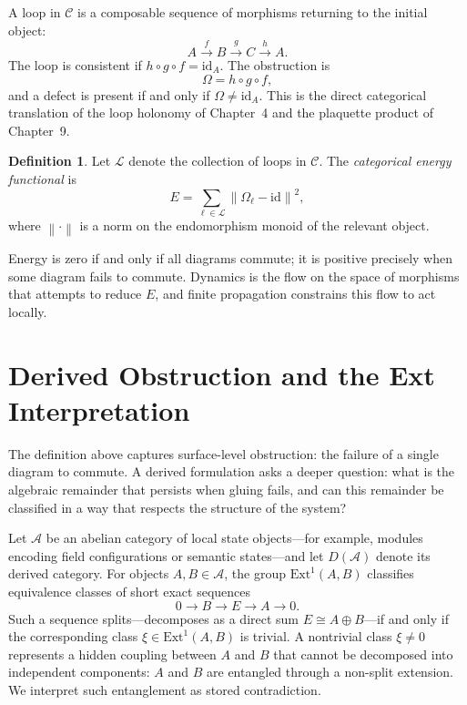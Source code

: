 \documentclass[12pt,a4paper,openany]{book}
\theoremstyle{plain}
\theoremstyle{definition}
\newtheorem{definition}[theorem]{Definition}
\theoremstyle{remark}
\newcommand{\Energy}{E}
\newcommand{\norm}[1]{\left\|#1\right\|}
\begin{document}
A loop in $\mathcal{C}$ is a composable sequence of morphisms returning to the initial object:
\[
A \xrightarrow{f} B \xrightarrow{g} C \xrightarrow{h} A.
\]
The loop is consistent if $h \circ g \circ f = \mathrm{id}_A$. The obstruction is
\[
\Omega = h \circ g \circ f,
\]
and a defect is present if and only if $\Omega \neq \mathrm{id}_A$. This is the direct categorical translation of the loop holonomy of Chapter~4 and the plaquette product of Chapter~9.

\begin{definition}
Let $\mathcal{L}$ denote the collection of loops in $\mathcal{C}$. The \emph{categorical energy functional} is
\[
\Energy = \sum_{\ell \in \mathcal{L}} \norm{\Omega_\ell - \mathrm{id}}^2,
\]
where $\norm{\cdot}$ is a norm on the endomorphism monoid of the relevant object.
\end{definition}

Energy is zero if and only if all diagrams commute; it is positive precisely when some diagram fails to commute. Dynamics is the flow on the space of morphisms that attempts to reduce $\Energy$, and finite propagation constrains this flow to act locally.

\section{Derived Obstruction and the Ext Interpretation}

The definition above captures surface-level obstruction: the failure of a single diagram to commute. A derived formulation asks a deeper question: what is the algebraic remainder that persists when gluing fails, and can this remainder be classified in a way that respects the structure of the system?

Let $\mathcal{A}$ be an abelian category of local state objects---for example, modules encoding field configurations or semantic states---and let $D(\mathcal{A})$ denote its derived category. For objects $A, B \in \mathcal{A}$, the group $\mathrm{Ext}^1(A, B)$ classifies equivalence classes of short exact sequences
\[
0 \to B \to E \to A \to 0.
\]
Such a sequence splits---decomposes as a direct sum $E \cong A \oplus B$---if and only if the corresponding class $\xi \in \mathrm{Ext}^1(A, B)$ is trivial. A nontrivial class $\xi \neq 0$ represents a hidden coupling between $A$ and $B$ that cannot be decomposed into independent components: $A$ and $B$ are entangled through a non-split extension. We interpret such entanglement as stored contradiction.
\end{document}
